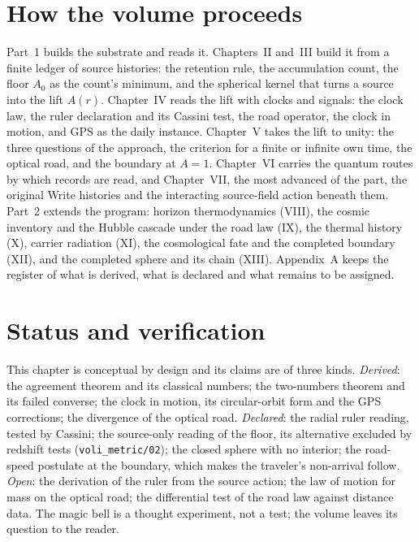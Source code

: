 \section{How the volume proceeds}
\label{sec:c1-map}

Part~1 builds the substrate and reads it. Chapters~II and~III build it from a finite ledger of source histories: the retention rule, the accumulation count, the floor $A_0$ as the count's minimum, and the spherical kernel that turns a source into the lift $A(r)$. Chapter~IV reads the lift with clocks and signals: the clock law, the ruler declaration and its Cassini test, the road operator, the clock in motion, and GPS as the daily instance. Chapter~V takes the lift to unity: the three questions of the approach, the criterion for a finite or infinite own time, the optical road, and the boundary at $A=1$. Chapter~VI carries the quantum routes by which records are read, and Chapter~VII, the most advanced of the part, the original Write histories and the interacting source-field action beneath them. Part~2 extends the program: horizon thermodynamics (VIII), the cosmic inventory and the Hubble cascade under the road law (IX), the thermal history (X), carrier radiation (XI), the cosmological fate and the completed boundary (XII), and the completed sphere and its chain (XIII). Appendix~A keeps the register of what is derived, what is declared and what remains to be assigned.

\section{Status and verification}
\label{sec:c1-status}

This chapter is conceptual by design and its claims are of three kinds. \emph{Derived}: the agreement theorem and its classical numbers; the two-numbers theorem and its failed converse; the clock in motion, its circular-orbit form and the GPS corrections; the divergence of the optical road. \emph{Declared}: the radial ruler reading, tested by Cassini; the source-only reading of the floor, its alternative excluded by redshift tests (\texttt{voli\_metric/02}); the closed sphere with no interior; the road-speed postulate at the boundary, which makes the traveler's non-arrival follow. \emph{Open}: the derivation of the ruler from the source action; the law of motion for mass on the optical road; the differential test of the road law against distance data. The magic bell is a thought experiment, not a test; the volume leaves its question to the reader.

